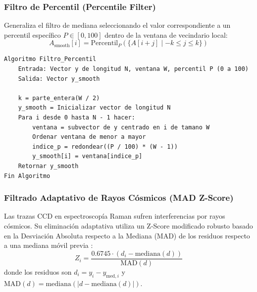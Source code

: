 \subsubsection{Filtro de Percentil (Percentile Filter)}
Generaliza el filtro de mediana seleccionando el valor correspondiente a un percentil específico $P \in [0, 100]$ dentro de la ventana de vecindario local:
\begin{equation}
    A_{\text{smooth}}[i] = \text{Percentil}_P \left( \{A[i + j] \mid -k \le j \le k\} \right)
\end{equation}

\begin{lstlisting}[caption=Algoritmo de Filtro de Percentil]
Algoritmo Filtro_Percentil
    Entrada: Vector y de longitud N, ventana W, percentil P (0 a 100)
    Salida: Vector y_smooth

    k = parte_entera(W / 2)
    y_smooth = Inicializar vector de longitud N
    Para i desde 0 hasta N - 1 hacer:
        ventana = subvector de y centrado en i de tamano W
        Ordenar ventana de menor a mayor
        indice_p = redondear((P / 100) * (W - 1))
        y_smooth[i] = ventana[indice_p]
    Retornar y_smooth
Fin Algoritmo
\end{lstlisting}

\subsubsection{Filtrado Adaptativo de Rayos Cósmicos (MAD Z-Score)}
Las trazas CCD en espectroscopía Raman sufren interferencias por rayos cósmicos. Su eliminación adaptativa utiliza un Z-Score modificado robusto basado en la Desviación Absoluta respecto a la Mediana (MAD) de los residuos respecto a una mediana móvil previa \cite{whitaker2018}:
\begin{equation}
    Z_i = \frac{0.6745 \cdot (d_i - \text{mediana}(d))}{\text{MAD}(d)}
\end{equation}
donde los residuos son $d_i = y_i - y_{\text{med}, i}$ y $\text{MAD}(d) = \text{mediana}(|d - \text{mediana}(d)|)$.

